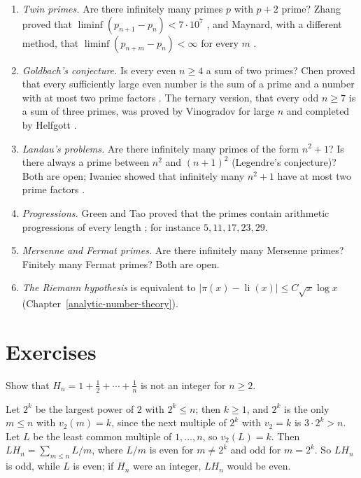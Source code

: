 \begin{enumerate}
\item \emph{Twin primes.} Are there infinitely many primes $p$ with $p + 2$ prime? Zhang proved that $\liminf(p_{n+1} - p_n) < 7 \cdot 10^7$ \cite{zhang-bounded-gaps}, and Maynard, with a different
method, that $\liminf(p_{n+m} - p_n) < \infty$ for every $m$ \cite{maynard-small-gaps}.
\item \emph{Goldbach's conjecture.} Is every even $n \geq 4$ a sum of two primes? Chen proved that every sufficiently large even number is the sum of a prime and a number with at most two prime factors
\cite{chen-goldbach}. The ternary version, that every odd $n \geq 7$ is a sum of three primes, was proved by Vinogradov for large $n$ and completed by Helfgott \cite{helfgott-ternary}.
\item \emph{Landau's problems.} Are there infinitely many primes of the form $n^2 + 1$? Is there always a prime between $n^2$ and $(n + 1)^2$ (Legendre's conjecture)? Both are open; Iwaniec showed that
infinitely many $n^2 + 1$ have at most two prime factors \cite{iwaniec-almost-primes}.
\item \emph{Progressions.} Green and Tao proved that the primes contain arithmetic progressions of every length \cite{green-tao}; for instance $5, 11, 17, 23, 29$.
\item \emph{Mersenne and Fermat primes.} Are there infinitely many Mersenne primes? Finitely many Fermat primes? Both are open.
\item \emph{The Riemann hypothesis} is equivalent to $|\pi(x) - \operatorname{li}(x)| \leq C\sqrt{x}\log x$ (Chapter~\ref{analytic-number-theory}).
\end{enumerate}

\section{Exercises}\label{prime-numbers:section-exercises}

\begin{exercise}\label{prime-numbers:exercise-harmonic}
Show that $H_n = 1 + \frac12 + \cdots + \frac1n$ is not an integer for $n \geq 2$.
\end{exercise}

\begin{solution}
Let $2^k$ be the largest power of $2$ with $2^k \leq n$; then $k \geq 1$, and $2^k$ is the only $m \leq n$ with $v_2(m) = k$, since the next multiple of $2^k$ with $v_2 = k$ is $3 \cdot 2^k > n$. Let $L$ be
the least common multiple of $1, \ldots, n$, so $v_2(L) = k$. Then $LH_n = \sum_{m \leq n}L/m$, where $L/m$ is even for $m \neq 2^k$ and odd for $m = 2^k$. So $LH_n$ is odd, while $L$ is even; if $H_n$
were an integer, $LH_n$ would be even.
\end{solution}

